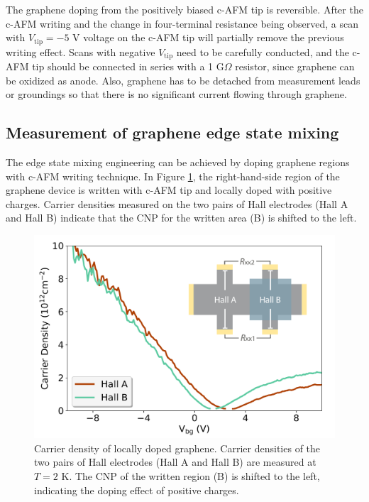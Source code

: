 \documentclass[pdflatex, sectionletters, 12pt]{pittetd}    %
\begin{document}
The graphene doping from the positively biased c-AFM tip is reversible. After the c-AFM writing and the change in four-terminal resistance being observed, a scan with $V_\mathrm{tip}= -5$ V voltage on the c-AFM tip will partially remove the previous writing effect. Scans with negative $V_\mathrm{tip}$ need to be carefully conducted, and the c-AFM tip should be connected in series with a 1 G$\Omega$ resistor, since graphene can be oxidized as anode\cite{alaboson2011conductive, byun2011nanoscale}. Also, graphene has to be detached from measurement leads or groundings so that there is no significant current flowing through graphene\cite{alaboson2011conductive}. 

\subsection{Measurement of graphene edge state mixing}

The edge state mixing engineering can be achieved by doping graphene regions with c-AFM writing technique. In Figure \ref{FIG:GrapheneDopedHall}, the right-hand-side region of the graphene device is written with c-AFM tip and locally doped with positive charges. Carrier densities measured on the two pairs of Hall electrodes (Hall A and Hall B) indicate that the CNP for the written area (B) is shifted to the left.
\\

\begin{figure}[h!]
	\centering
	\includegraphics[width=.7\textwidth]{Drawing/GrapheneDopedHall.pdf}
	\caption{Carrier density of locally doped graphene. Carrier densities of the two pairs of Hall electrodes (Hall A and Hall B) are measured at $T = 2$ K. The CNP of the written region (B) is shifted to the left, indicating the doping effect of positive charges.}
	\label{FIG:GrapheneDopedHall}
\end{figure}
\end{document}
